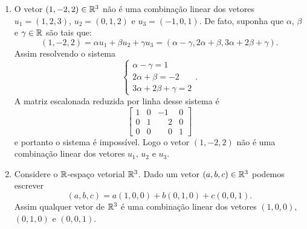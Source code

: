 \begin{exemplo}
\begin{enumerate}[label={\arabic*})]
    \item O vetor $(1, -2, 2) \in \mathbb{R}^3$ não é uma combinação linear dos vetores $u_1 = (1, 2, 3)$, $u_2 = (0, 1, 2)$ e $u_3 = (-1, 0, 1)$. De fato, suponha que $\alpha$, $\beta$ e $\gamma \in \mathbb{R}$ são tais que:
          \[
            (1, -2, 2) = \alpha u_1 + \beta u_2 + \gamma u_3 = (\alpha - \gamma, 2\alpha + \beta, 3\alpha + 2\beta + \gamma).
          \]
          Assim resolvendo o sistema
          \[
            \begin{cases}
              \alpha - \gamma = 1  \\
              2\alpha + \beta = -2 \\
              3\alpha + 2\beta + \gamma = 2
            \end{cases}.
          \]
          A matriz escalonada reduzida por linha desse sistema é
          \[
            \begin{bmatrix}
              1 & 0 & -1           & 0 \\
              0 & 1 & \phantom{-}2 & 0 \\
              0 & 0 & \phantom{-}0 & 1
            \end{bmatrix}
          \]
          e portanto o sistema é impossível. Logo o vetor $(1, -2, 2)$ não é uma combinação linear dos vetores $u_1$, $u_2$ e $u_3$.

    \item Considere o $\mathbb{R}$-espaço vetorial $\mathbb{R}^3$. Dado um vetor $(a, b, c) \in \mathbb{R}^3$ podemos escrever
          \[
            (a, b, c) = a(1, 0, 0) + b(0, 1, 0) + c(0, 0, 1).
          \]
          Assim qualquer vetor de $\mathbb{R}^3$ é uma combinação linear dos vetores $(1, 0 , 0)$, $(0, 1 , 0)$ e $(0, 0 , 1)$.


\end{enumerate}
\end{exemplo}
